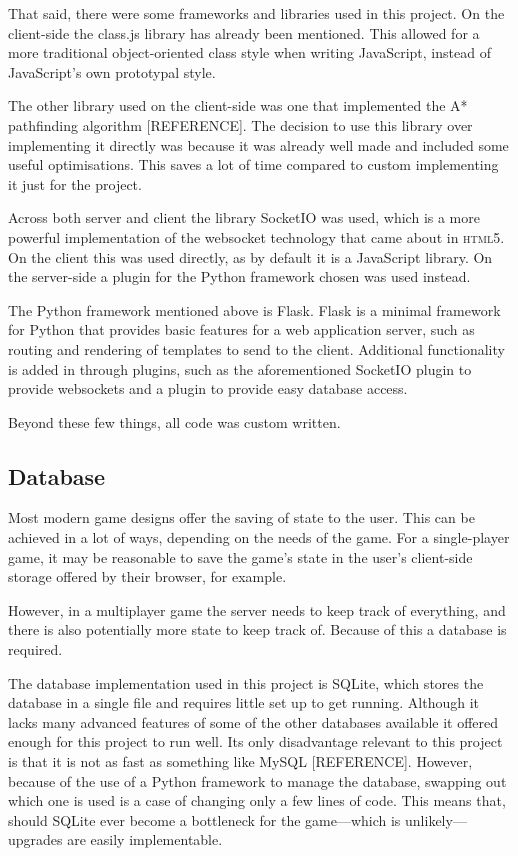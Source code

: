 That said, there were some frameworks and libraries used in this project. On the client-side the class.js library has already been mentioned. This allowed for a more traditional object-oriented class style when writing JavaScript, instead of JavaScript's own prototypal style.

The other library used on the client-side was one that implemented the A* pathfinding algorithm [REFERENCE]. The decision to use this library over implementing it directly was because it was already well made and included some useful optimisations. This saves a lot of time compared to custom implementing it just for the project.

Across both server and client the library SocketIO was used, which is a more powerful implementation of the websocket technology that came about in \textsc{html5}. On the client this was used directly, as by default it is a JavaScript library. On the server-side a plugin for the Python framework chosen was used instead.

The Python framework mentioned above is Flask. Flask is a minimal framework for Python that provides basic features for a web application server, such as routing and rendering of templates to send to the client. Additional functionality is added in through plugins, such as the aforementioned SocketIO plugin to provide websockets and a plugin to provide easy database access.

Beyond these few things, all code was custom written.

\subsection{Database}
Most modern game designs offer the saving of state to the user. This can be achieved in a lot of ways, depending on the needs of the game. For a single-player game, it may be reasonable to save the game's state in the user's client-side storage offered by their browser, for example.

However, in a multiplayer game the server needs to keep track of everything, and there is also potentially more state to keep track of. Because of this a database is required.

The database implementation used in this project is SQLite, which stores the database in a single file and requires little set up to get running. Although it lacks many advanced features of some of the other databases available it offered enough for this project to run well. Its only disadvantage relevant to this project is that it is not as fast as something like MySQL [REFERENCE]. However, because of the use of a Python framework to manage the database, swapping out which one is used is a case of changing only a few lines of code. This means that, should SQLite ever become a bottleneck for the game---which is unlikely---upgrades are easily implementable.

